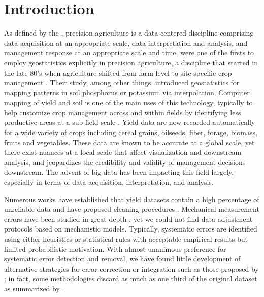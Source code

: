 \chapter{Introduction}

As defined by the \citet{Council1997}, precision agriculture is a
data-centered discipline comprising data acquisition at an appropriate
scale, data interpretation and analysis, and management response at an
appropriate scale and time. \cite{Miller1988} were one of the firsts
to employ geostatistics explicitly in precision agriculture, a
discipline that started in the late 80's when agriculture shifted from
farm-level to site-specific crop management \citep{Oliver2010}. Their
study, among other things, introduced geostatistics for mapping
patterns in soil phosphorus or potassium via interpolation. Computer
mapping of yield and soil is one of the main uses of this technology,
typically to help customize crop management across and within fields
by identifying less productive areas at a sub-field scale
\citep{Lowenberg-DeBoer2019}. Yield data are now recorded
automatically for a wide variety of crops including cereal grains,
oilseeds, fiber, forage, biomass, fruits and vegetables. These data
are known to be accurate at a global scale, yet there exist nuances at
a local scale that affect visualization and downstream analysis, and
jeopardizes the credibility and validity of management decisions
downstream. The advent of big data has been impacting this field
largely, especially in terms of data acquisition, interpretation, and
analysis.

Numerous works have established that yield datasets contain a high
percentage of unreliable data and have proposed cleaning procedures
\citep{Blackmore1996, Moore1998, Blackmore1999, Thylen2000, Noack2003,
  Simbahan2004, Ping2005, Sudduth2007, Sudduth2012, Spekken2013,
  Leroux2018, Leroux2019, Vega2019}. Mechanical measurement errors
have been studied in great depth \citep{Arslan1999, Arslan2002,
  Grisso2002, Burks2004, Hemming2005, Fulton2009, Schuster2017}, yet
we could not find data adjustment protocols based on mechanistic
models. Typically, systematic errors are identified using either
heuristics or statistical rules with acceptable empirical results but
limited probabilistic motivation. With almost unanimous preference for
systematic error detection and removal, we have found little
development of alternative strategies for error correction or
integration such as those proposed by \cite{Bachmaier2007,
  Bachmaier2010}; in fact, some methodologies discard as much as one
third of the original dataset as summarized by \cite{Lyle2013}.

